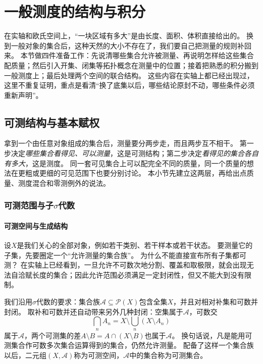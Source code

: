 \section{一般测度的结构与积分}
\label{sec:measure-general-structure}

在实轴和欧氏空间上，“一块区域有多大”是由长度、面积、体积直接给出的。
换到一般对象的集合后，这种天然的大小不存在了，我们要自己把测量的规则补回来。
本节做四件准备工作：先说清哪些集合允许被测量、再说明怎样给这些集合配质量；然后引入开集、闭集等拓扑概念在测量中的位置；接着把熟悉的积分搬到一般测度上；最后处理两个空间的联合结构。
这些内容在实轴上都已经出现过，这里不重复证明，重点是看清“换了底集以后，哪些结论原封不动，哪些条件必须重新声明”。

\subsection{可测结构与基本赋权}

拿到一个由任意对象组成的集合后，测量要分两步走，而且两步互不相干。
第一步决定\emph{哪些集合看得见、可以测量}，这是可测结构；第二步决定\emph{看得见的集合各自有多大}，这是测度。
同一套可见集合上可以配完全不同的质量，同一个质量的想法在更粗或更细的可见范围下也要分别讨论。
本小节先建立这两层，再给出点质量、测度混合和零测例外的说法。

\subsubsection{可测范围与子$\sigma$代数}

\paragraph{可测空间与生成结构}

设$X$是我们关心的全部对象，例如若干类别、若干样本或若干状态。
要测量它的子集，先要圈定一个“允许测量的集合族”。
为什么不能直接宣布所有子集都可测？
在实轴上已经看到，一旦允许不可数次地分割、覆盖和取极限，就会出现无法自洽赋长度的集合；因此允许范围必须满足一定封闭性，但又不能大到没有限制。

我们沿用$\sigma$代数的要求：集合族$\mathcal A\subseteq\mathcal P(X)$包含全集$X$，并且对相对补集和可数并封闭。
取补和可数并还自动带来另外几种封闭：空集属于$\mathcal A$，可数交
\[
 \bigcap_nA_n=X\setminus\bigcup_n(X\setminus A_n)
\]
属于$\mathcal A$，两个可测集的差$A\setminus B=A\cap(X\setminus B)$也属于$\mathcal A$。
换句话说，凡是能用可测集合作可数多次集合运算得到的集合，仍然允许测量。
配备了这样一个集合族以后，二元组$(X,\mathcal A)$称为可测空间，$\mathcal A$中的集合称为可测集合。

